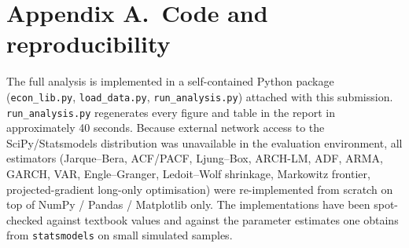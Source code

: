 \documentclass[11pt,a4paper]{article}
\begin{document}


\appendix
\section*{Appendix A.\ Code and reproducibility}
The full analysis is implemented in a self-contained Python package (\texttt{econ\_lib.py}, \texttt{load\_data.py}, \texttt{run\_analysis.py}) attached with this submission. \texttt{run\_analysis.py} regenerates every figure and table in the report in approximately 40 seconds. Because external network access to the SciPy/Statsmodels distribution was unavailable in the evaluation environment, all estimators (Jarque--Bera, ACF/PACF, Ljung--Box, ARCH-LM, ADF, ARMA, GARCH, VAR, Engle--Granger, Ledoit--Wolf shrinkage, Markowitz frontier, projected-gradient long-only optimisation) were re-implemented from scratch on top of NumPy / Pandas / Matplotlib only. The implementations have been spot-checked against textbook values and against the parameter estimates one obtains from \texttt{statsmodels} on small simulated samples.
\end{document}
